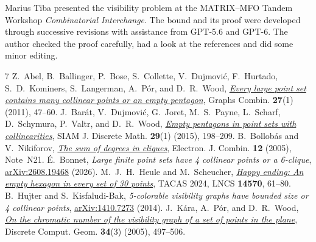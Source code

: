 \documentclass[11pt,a4paper]{amsart}
\begin{document}
Marius Tiba presented the visibility problem at the MATRIX--MFO Tandem
Workshop \emph{Combinatorial Interchange}. The bound and its proof were
developed through successive revisions with assistance from GPT-5.6 and
GPT-6. The author checked the proof carefully, had a look at the references and did some minor editing.

\begin{thebibliography}{7}
 Z.~Abel, B.~Ballinger, P.~Bose, S.~Collette,
V.~Dujmovi\'c, F.~Hurtado, S.~D.~Kominers, S.~Langerman, A.~P\'or,
and D.~R.~Wood,
\emph{\href{https://doi.org/10.1007/s00373-010-0957-2}{Every large point set
contains many collinear points or an empty pentagon}},
Graphs Combin. \textbf{27}(1) (2011), 47--60.
 J.~Bar\'at, V.~Dujmovi\'c, G.~Joret, M.~S.~Payne,
L.~Scharf, D.~Schymura, P.~Valtr, and D.~R.~Wood,
\emph{\href{https://doi.org/10.1137/130950422}{Empty pentagons in point
sets with collinearities}},
SIAM J. Discrete Math. \textbf{29}(1) (2015), 198--209.
 B.~Bollob\'as and V.~Nikiforov,
\emph{\href{https://doi.org/10.37236/1988}{The sum of degrees in cliques}},
Electron. J. Combin. \textbf{12} (2005), Note~N21.
 \'E.~Bonnet,
\emph{Large finite point sets have 4 collinear points or a 6-clique},
\href{https://arxiv.org/abs/2608.19468}{arXiv:2608.19468} (2026).
 M.~J.~H.~Heule and M.~Scheucher,
\emph{\href{https://doi.org/10.1007/978-3-031-57246-3_5}{Happy ending:
An empty hexagon in every set of 30 points}},
TACAS 2024, LNCS \textbf{14570}, 61--80.
 B.~Hujter and S.~Kisfaludi-Bak,
\emph{5-colorable visibility graphs have bounded size or 4 collinear points},
\href{https://arxiv.org/abs/1410.7273}{arXiv:1410.7273} (2014).
 J.~K\'ara, A.~P\'or, and D.~R.~Wood,
\emph{\href{https://doi.org/10.1007/s00454-005-1177-z}{On the chromatic
number of the visibility graph of a set of points in the plane}},
Discrete Comput. Geom. \textbf{34}(3) (2005), 497--506.
\end{thebibliography}
\end{document}

